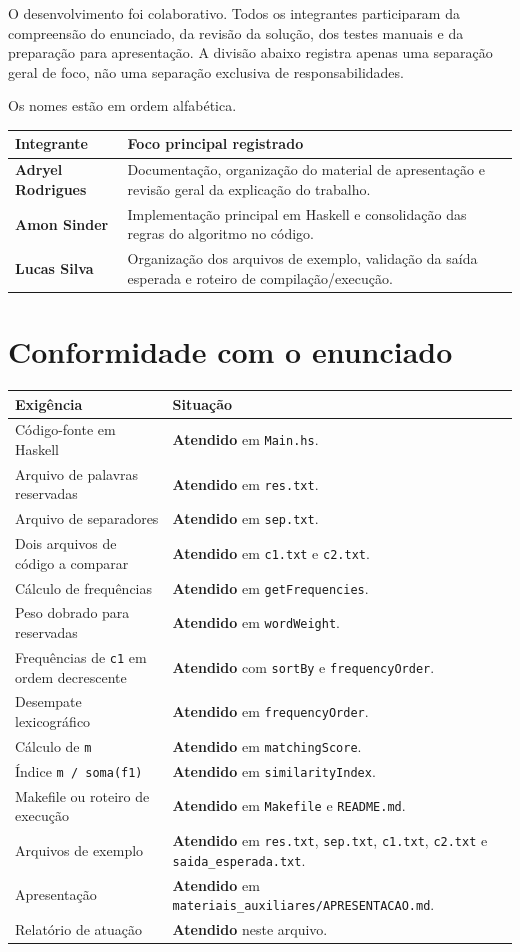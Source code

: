 \documentclass[12pt,a4paper]{article}
\newcommand{\arquivo}[1]{\texttt{#1}}
\newcommand{\ok}{\textbf{Atendido}}
\begin{document}
O desenvolvimento foi colaborativo. Todos os integrantes participaram da compreensão do enunciado, da revisão da solução, dos testes manuais e da preparação para apresentação. A divisão abaixo registra apenas uma separação geral de foco, não uma separação exclusiva de responsabilidades.

Os nomes estão em ordem alfabética.

\begin{tabularx}{\textwidth}{>{\bfseries}p{3.5cm}X}
\toprule
Integrante & Foco principal registrado \\
\midrule
Adryel Rodrigues & Documentação, organização do material de apresentação e revisão geral da explicação do trabalho. \\
Amon Sinder & Implementação principal em Haskell e consolidação das regras do algoritmo no código. \\
Lucas Silva & Organização dos arquivos de exemplo, validação da saída esperada e roteiro de compilação/execução. \\
\bottomrule
\end{tabularx}

\section{Conformidade com o enunciado}

\begin{longtable}{p{7cm}p{7.5cm}}
\toprule
\textbf{Exigência} & \textbf{Situação} \\
\midrule
\endhead
Código-fonte em Haskell & \ok{} em \arquivo{Main.hs}. \\
Arquivo de palavras reservadas & \ok{} em \arquivo{res.txt}. \\
Arquivo de separadores & \ok{} em \arquivo{sep.txt}. \\
Dois arquivos de código a comparar & \ok{} em \arquivo{c1.txt} e \arquivo{c2.txt}. \\
Cálculo de frequências & \ok{} em \arquivo{getFrequencies}. \\
Peso dobrado para reservadas & \ok{} em \arquivo{wordWeight}. \\
Frequências de \arquivo{c1} em ordem decrescente & \ok{} com \arquivo{sortBy} e \arquivo{frequencyOrder}. \\
Desempate lexicográfico & \ok{} em \arquivo{frequencyOrder}. \\
Cálculo de \arquivo{m} & \ok{} em \arquivo{matchingScore}. \\
Índice \arquivo{m / soma(f1)} & \ok{} em \arquivo{similarityIndex}. \\
Makefile ou roteiro de execução & \ok{} em \arquivo{Makefile} e \arquivo{README.md}. \\
Arquivos de exemplo & \ok{} em \arquivo{res.txt}, \arquivo{sep.txt}, \arquivo{c1.txt}, \arquivo{c2.txt} e \arquivo{saida\_esperada.txt}. \\
Apresentação & \ok{} em \arquivo{materiais\_auxiliares/APRESENTACAO.md}. \\
Relatório de atuação & \ok{} neste arquivo. \\
\bottomrule
\end{longtable}
\end{document}
